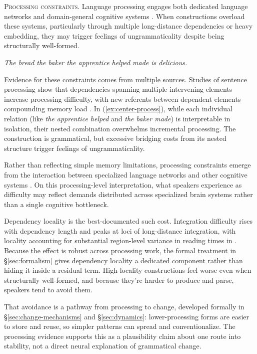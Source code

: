 \documentclass[12pt,letterpaper]{article}
\newcommand{\mention}[1]{\textit{#1}}
\begin{document}
\noindent\textsc{Processing constraints.} Language processing engages both dedicated language networks and domain-general cognitive systems \autocite{Fedorenko2024}. When constructions overload these systems, particularly through multiple long-distance dependencies or heavy embedding, they may trigger feelings of ungrammaticality despite being structurally well-formed.

\ea
\mention{The bread the baker the apprentice helped made is delicious.}\label{ex:center-process}
\z

Evidence for these constraints comes from multiple sources. Studies of sentence processing show that dependencies spanning multiple intervening elements increase processing difficulty, with new referents between dependent elements compounding memory load \autocite{gibson2000,gibson2026}. In (\ref{ex:center-process}), while each individual relation (like \mention{the apprentice helped} and \mention{the baker made}) is interpretable in isolation, their nested combination overwhelms incremental processing. The construction is grammatical, but excessive bridging costs from its nested structure trigger feelings of ungrammaticality.

Rather than reflecting simple memory limitations, processing constraints emerge from the interaction between specialized language networks and other cognitive systems \autocite{Fedorenko2024}. On this processing-level interpretation, what speakers experience as difficulty may reflect demands distributed across specialized brain systems rather than a single cognitive bottleneck.

Dependency locality is the best-documented such cost. Integration difficulty rises with dependency length and peaks at loci of long-distance integration, with locality accounting for substantial region-level variance in reading times in \textcite{GrodnerGibson2005}. Because the effect is robust across processing work, the formal treatment in \S\ref{sec:formalism} gives dependency locality a dedicated component rather than hiding it inside a residual term. High-locality constructions feel worse even when structurally well-formed, and because they're harder to produce and parse, speakers tend to avoid them.

That avoidance is a pathway from processing to change, developed formally in \S\ref{sec:change-mechanisms} and \S\ref{sec:dynamics}: lower-processing forms are easier to store and reuse, so simpler patterns can spread and conventionalize. The processing evidence supports this as a plausibility claim about one route into stability, not a direct neural explanation of grammatical change.
\end{document}

